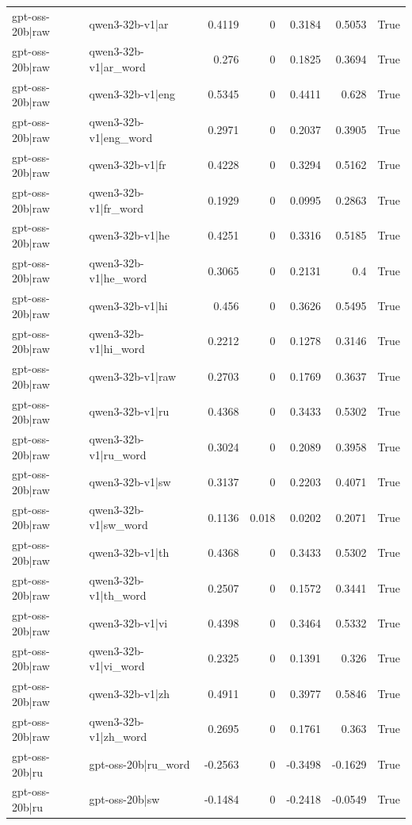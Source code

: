 \begin{table}
\begin{tabular}{l l r r r r l}
gpt-oss-20b|raw & qwen3-32b-v1|ar & 0.4119 & 0 & 0.3184 & 0.5053 & True \\
gpt-oss-20b|raw & qwen3-32b-v1|ar_word & 0.276 & 0 & 0.1825 & 0.3694 & True \\
gpt-oss-20b|raw & qwen3-32b-v1|eng & 0.5345 & 0 & 0.4411 & 0.628 & True \\
gpt-oss-20b|raw & qwen3-32b-v1|eng_word & 0.2971 & 0 & 0.2037 & 0.3905 & True \\
gpt-oss-20b|raw & qwen3-32b-v1|fr & 0.4228 & 0 & 0.3294 & 0.5162 & True \\
gpt-oss-20b|raw & qwen3-32b-v1|fr_word & 0.1929 & 0 & 0.0995 & 0.2863 & True \\
gpt-oss-20b|raw & qwen3-32b-v1|he & 0.4251 & 0 & 0.3316 & 0.5185 & True \\
gpt-oss-20b|raw & qwen3-32b-v1|he_word & 0.3065 & 0 & 0.2131 & 0.4 & True \\
gpt-oss-20b|raw & qwen3-32b-v1|hi & 0.456 & 0 & 0.3626 & 0.5495 & True \\
gpt-oss-20b|raw & qwen3-32b-v1|hi_word & 0.2212 & 0 & 0.1278 & 0.3146 & True \\
gpt-oss-20b|raw & qwen3-32b-v1|raw & 0.2703 & 0 & 0.1769 & 0.3637 & True \\
gpt-oss-20b|raw & qwen3-32b-v1|ru & 0.4368 & 0 & 0.3433 & 0.5302 & True \\
gpt-oss-20b|raw & qwen3-32b-v1|ru_word & 0.3024 & 0 & 0.2089 & 0.3958 & True \\
gpt-oss-20b|raw & qwen3-32b-v1|sw & 0.3137 & 0 & 0.2203 & 0.4071 & True \\
gpt-oss-20b|raw & qwen3-32b-v1|sw_word & 0.1136 & 0.018 & 0.0202 & 0.2071 & True \\
gpt-oss-20b|raw & qwen3-32b-v1|th & 0.4368 & 0 & 0.3433 & 0.5302 & True \\
gpt-oss-20b|raw & qwen3-32b-v1|th_word & 0.2507 & 0 & 0.1572 & 0.3441 & True \\
gpt-oss-20b|raw & qwen3-32b-v1|vi & 0.4398 & 0 & 0.3464 & 0.5332 & True \\
gpt-oss-20b|raw & qwen3-32b-v1|vi_word & 0.2325 & 0 & 0.1391 & 0.326 & True \\
gpt-oss-20b|raw & qwen3-32b-v1|zh & 0.4911 & 0 & 0.3977 & 0.5846 & True \\
gpt-oss-20b|raw & qwen3-32b-v1|zh_word & 0.2695 & 0 & 0.1761 & 0.363 & True \\
gpt-oss-20b|ru & gpt-oss-20b|ru_word & -0.2563 & 0 & -0.3498 & -0.1629 & True \\
gpt-oss-20b|ru & gpt-oss-20b|sw & -0.1484 & 0 & -0.2418 & -0.0549 & True \\

\end{tabular}
\end{table}
